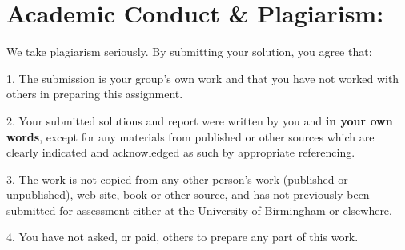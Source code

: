 \documentclass[11pt]{article}
\begin{document}
\section*{Academic Conduct \& Plagiarism:}
We take plagiarism seriously. By submitting your solution, you agree that:

1. The submission is your group's own work and that you have not worked with others in preparing this assignment.

2. Your submitted solutions and report were written by you and \textbf{in your own words}, except for any materials from published or other sources which are clearly indicated and acknowledged as such by appropriate referencing.

3. The work is not copied from any other person's work (published or unpublished), web site, book or other source, and has not previously been submitted for assessment either at the University of Birmingham or elsewhere.

4. You have not asked, or paid, others to prepare any part of this work.
\end{document}
